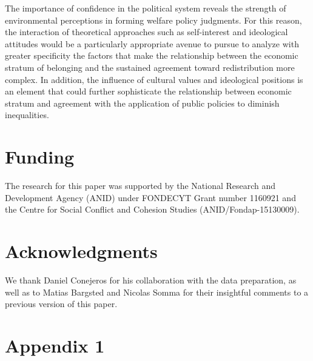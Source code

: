 \documentclass[utf8]{frontiersSCNS} %
\begin{document}
The importance of confidence in the political system reveals the strength of environmental perceptions in forming welfare policy judgments. For this reason, the interaction of theoretical approaches such as self-interest and ideological attitudes would be a particularly appropriate avenue to pursue to analyze with greater specificity the factors that make the relationship between the economic stratum of belonging and the sustained agreement toward redistribution more complex. In addition, the influence of cultural values and ideological positions is an element that could further sophisticate the relationship between economic stratum and agreement with the application of public policies to diminish inequalities.

\section*{Funding}
The research for this paper was supported by the National Research and Development Agency (ANID) under FONDECYT Grant number 1160921 and the Centre for Social Conflict and Cohesion Studies (ANID/Fondap-15130009).

\section*{Acknowledgments}
We thank Daniel Conejeros for his collaboration with the data preparation, as well as to Matias Bargsted and Nicolas Somma for their insightful comments to a previous version of this paper.

\theendnotes

\printbibliography

\newpage

\section{Appendix 1}
\end{document}
